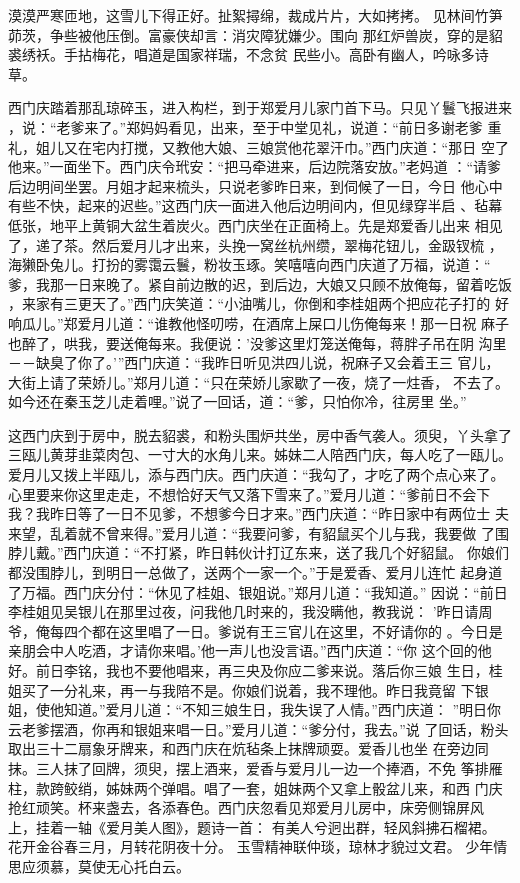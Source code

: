 漠漠严寒匝地，这雪儿下得正好。扯絮撏绵，裁成片片，大如拷拷。
见林间竹笋茆茨，争些被他压倒。富豪侠却言：消灾障犹嫌少。围向
那红炉兽炭，穿的是貂裘绣袄。手拈梅花，唱道是国家祥瑞，不念贫
民些小。高卧有幽人，吟咏多诗草。

西门庆踏着那乱琼碎玉，进入构栏，到于郑爱月儿家门首下马。只见丫鬟飞报进来
，说：“老爹来了。”郑妈妈看见，出来，至于中堂见礼，说道：“前日多谢老爹
重礼，姐儿又在宅内打搅，又教他大娘、三娘赏他花翠汗巾。”西门庆道：“那日
空了他来。”一面坐下。西门庆令玳安：“把马牵进来，后边院落安放。”老妈道
：“请爹后边明间坐罢。月姐才起来梳头，只说老爹昨日来，到伺候了一日，今日
他心中有些不快，起来的迟些。”这西门庆一面进入他后边明间内，但见绿穿半启
、毡幕低张，地平上黄铜大盆生着炭火。西门庆坐在正面椅上。先是郑爱香儿出来
相见了，递了茶。然后爱月儿才出来，头挽一窝丝杭州缵，翠梅花钮儿，金趿钗梳
，海獭卧兔儿。打扮的雾霭云鬟，粉妆玉琢。笑嘻嘻向西门庆道了万福，说道：“
爹，我那一日来晚了。紧自前边散的迟，到后边，大娘又只顾不放俺每，留着吃饭
，来家有三更天了。”西门庆笑道：“小油嘴儿，你倒和李桂姐两个把应花子打的
好响瓜儿。”郑爱月儿道：“谁教他怪叨唠，在酒席上屎口儿伤俺每来！那一日祝
麻子也醉了，哄我，要送俺每来。我便说：'没爹这里灯笼送俺每，蒋胖子吊在阴
沟里－－缺臭了你了。'”西门庆道：“我昨日听见洪四儿说，祝麻子又会着王三
官儿，大街上请了荣娇儿。”郑月儿道：“只在荣娇儿家歇了一夜，烧了一炷香，
不去了。如今还在秦玉芝儿走着哩。”说了一回话，道：“爹，只怕你冷，往房里
坐。”

这西门庆到于房中，脱去貂裘，和粉头围炉共坐，房中香气袭人。须臾，丫头拿了
三瓯儿黄芽韭菜肉包、一寸大的水角儿来。姊妹二人陪西门庆，每人吃了一瓯儿。
爱月儿又拨上半瓯儿，添与西门庆。西门庆道：“我勾了，才吃了两个点心来了。
心里要来你这里走走，不想恰好天气又落下雪来了。”爱月儿道：“爹前日不会下
我？我昨日等了一日不见爹，不想爹今日才来。”西门庆道：“昨日家中有两位士
夫来望，乱着就不曾来得。”爱月儿道：“我要问爹，有貂鼠买个儿与我，我要做
了围脖儿戴。”西门庆道：“不打紧，昨日韩伙计打辽东来，送了我几个好貂鼠。
你娘们都没围脖儿，到明日一总做了，送两个一家一个。”于是爱香、爱月儿连忙
起身道了万福。西门庆分付：“休见了桂姐、银姐说。”郑月儿道：“我知道。”
因说：“前日李桂姐见吴银儿在那里过夜，问我他几时来的，我没瞒他，教我说：
'昨日请周爷，俺每四个都在这里唱了一日。爹说有王三官儿在这里，不好请你的
。今日是亲朋会中人吃酒，才请你来唱。'他一声儿也没言语。”西门庆道：“你
这个回的他好。前日李铭，我也不要他唱来，再三央及你应二爹来说。落后你三娘
生日，桂姐买了一分礼来，再一与我陪不是。你娘们说着，我不理他。昨日我竟留
下银姐，使他知道。”爱月儿道：“不知三娘生日，我失误了人情。”西门庆道：
”明日你云老爹摆酒，你再和银姐来唱一日。”爱月儿道：“爹分付，我去。”说
了回话，粉头取出三十二扇象牙牌来，和西门庆在炕毡条上抹牌顽耍。爱香儿也坐
在旁边同抹。三人抹了回牌，须臾，摆上酒来，爱香与爱月儿一边一个捧酒，不免
筝排雁柱，款跨鲛绡，姊妹两个弹唱。唱了一套，姐妹两个又拿上骰盆儿来，和西
门庆抢红顽笑。杯来盏去，各添春色。西门庆忽看见郑爱月儿房中，床旁侧锦屏风
上，挂着一轴《爱月美人图》，题诗一首：
有美人兮迥出群，轻风斜拂石榴裙。
花开金谷春三月，月转花阴夜十分。
玉雪精神联仲琰，琼林才貌过文君。
少年情思应须慕，莫使无心托白云。

